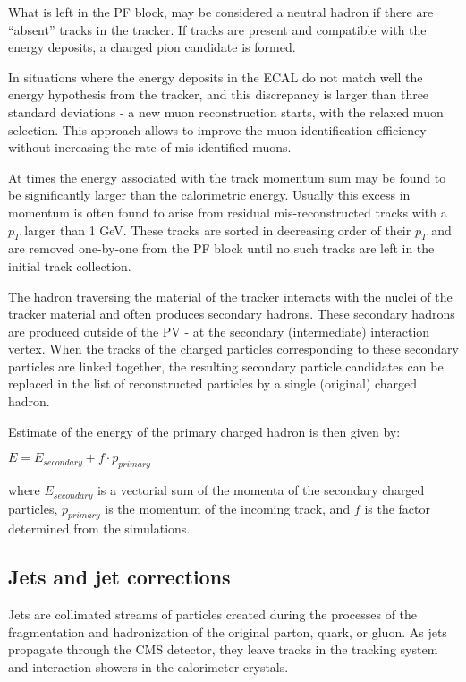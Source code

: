What is left in the PF block, may be considered a neutral hadron if there are ``absent'' tracks in the tracker. If tracks are present and compatible with the  energy deposits, a charged pion candidate is formed. 

In situations where the energy deposits in the ECAL do not match well the energy hypothesis from the tracker, and this discrepancy is larger than three standard deviations - a new muon reconstruction starts, with the relaxed muon selection. This approach allows to improve the muon identification efficiency without increasing the rate of mis-identified muons. 

At times the energy associated with the track momentum sum may be found to be significantly larger than the calorimetric energy. Usually this excess in momentum is often found to arise from residual mis-reconstructed tracks with a $p_T$ larger than 1 GeV. These tracks are sorted in decreasing order of their $p_T$ and are removed one-by-one from the PF block until no such tracks are left in the initial track collection.

The hadron traversing the material of the tracker interacts with the nuclei of the tracker material and often produces secondary hadrons. These secondary hadrons are produced outside of the PV - at the secondary (intermediate) interaction vertex. When the tracks of the charged particles corresponding to these secondary particles are linked together, the resulting secondary particle candidates can be  replaced in the list of reconstructed particles by a single (original) charged hadron.  

Estimate of the energy of the primary charged hadron is then given by:

$E = E_{secondary} + f \cdot p_{primary}$

\noindent where $E_{secondary}$ is a vectorial sum of the momenta of the secondary charged particles, $p_{primary}$ is the momentum of the incoming track, and $f$ is the factor determined from the simulations. 

\subsection{Jets and jet corrections}\label{sec:jets}

Jets are collimated streams of particles created during the processes of the fragmentation and hadronization of the original parton, quark, or gluon. As jets propagate through the CMS detector, they leave tracks in the tracking system and interaction showers in the calorimeter crystals. 


